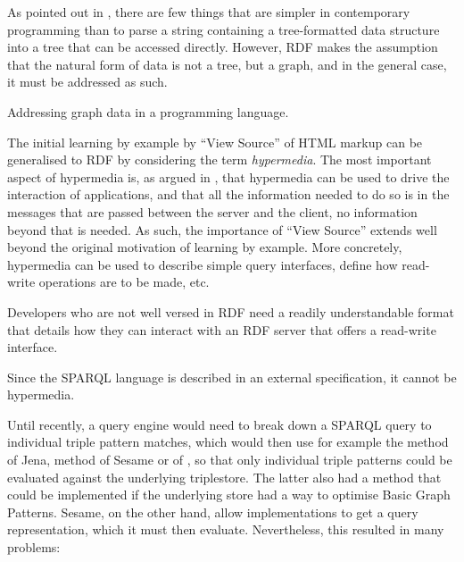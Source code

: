 As pointed out in \cite{darobin1}, there are few things that are
simpler in contemporary programming than to parse a string containing
a tree-formatted data structure into a tree that can be accessed
directly. However, RDF makes the assumption that the natural form of
data is not a tree, but a graph, and in the general case, it must be
addressed as such.

\begin{problem}\label{prob:graph}
Addressing graph data in a programming language.
\end{problem}

The initial learning by example by ``View Source'' of HTML markup can
be generalised to RDF by considering the term \emph{hypermedia}. The
most important aspect of hypermedia is, as argued in
\cite{Fielding_2000_Architectural-Styles}, that hypermedia can be used
to drive the interaction of applications, and that all the information
needed to do so is in the messages that are passed between the server
and the client, no information beyond that is needed. As such, the
importance of ``View Source'' extends well beyond the original
motivation of learning by example. More concretely, hypermedia can be
used to describe simple query interfaces, define how read-write
operations are to be made, etc. %

\begin{problem}\label{prob:lapis}
Developers who are not well versed in RDF need a readily
understandable format that details how they can interact with an RDF
server that offers a read-write interface.
\end{problem}

\begin{problem}\label{prob:tpf}
Since the SPARQL language is described in an external specification,
it cannot be hypermedia.
\end{problem}

Until recently, a query engine would need to break down a SPARQL query
to individual triple pattern matches, which would then use for example
the  method of Jena,  method
of Sesame or  of , so that only
individual triple patterns could be evaluated against the underlying
triplestore.  The latter also had a  method that
could be implemented if the underlying store had a way to optimise
Basic Graph Patterns. Sesame, on the other hand, allow implementations
to get a query representation, which it must then evaluate.
Nevertheless, this resulted in many problems:

